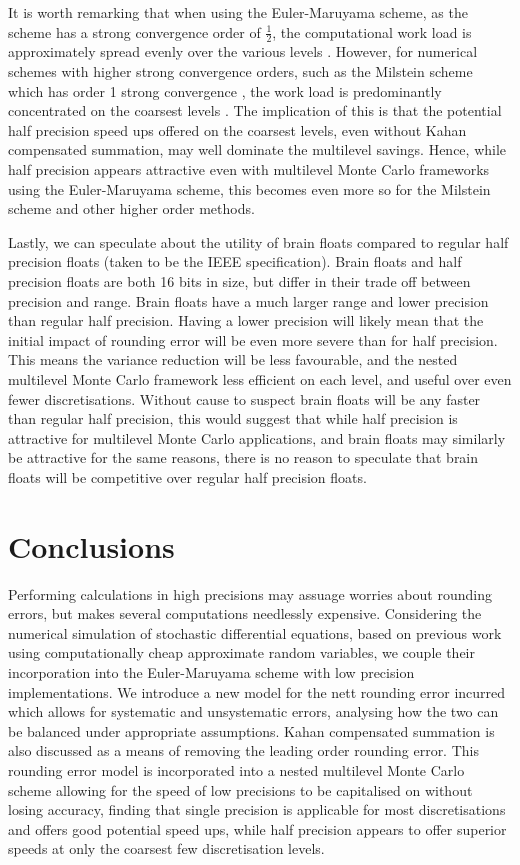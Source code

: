 \documentclass[9pt,a4paper,english]{extarticle}
\begin{document}
It is worth remarking that when using the Euler-Maruyama scheme, as the scheme has a strong convergence order of $ \tfrac{1}{2} $, the computational work load is approximately spread evenly over the various levels \citep{giles2008multilevel}. However, for numerical schemes with higher strong convergence orders, such as the Milstein scheme which has order 1 strong convergence \citep{kloeden1999numerical,glasserman2013monte}, the work load is predominantly concentrated on the coarsest levels \citep{giles2008multilevel}. The implication of this is that the potential half precision speed ups offered on the coarsest levels, even without Kahan compensated summation, may well dominate the multilevel savings. Hence, while half precision appears attractive even with multilevel Monte Carlo frameworks using the Euler-Maruyama scheme, this becomes even more so for the Milstein scheme and other higher order methods. 

Lastly, we can speculate about the utility of brain floats compared to regular half precision floats (taken to be the IEEE specification). Brain floats and half precision floats are both 16 bits in size, but differ in their trade off between precision and range. Brain floats have a much larger range and lower precision than regular half precision. Having a lower precision will likely mean that the initial impact of rounding error will be even more severe than for half precision. This means the variance reduction will be less favourable, and the nested multilevel Monte Carlo framework less efficient on each level, and useful over even fewer discretisations. Without cause to suspect brain floats will be any faster than regular half precision, this would suggest that while half precision is attractive for multilevel Monte Carlo applications, and brain floats may similarly be attractive for the same reasons, there is no reason to speculate that brain floats will be competitive over regular half precision floats. 

\section{Conclusions}
\label{sec:conclusions}

Performing calculations in high precisions may assuage worries about rounding errors, but makes several computations needlessly expensive. Considering the numerical simulation of stochastic differential equations, based on previous work using computationally cheap approximate random variables, we couple their incorporation into the Euler-Maruyama scheme with low precision implementations. We introduce a new model for the nett rounding error incurred which allows for systematic and unsystematic errors, analysing how the two can be balanced under appropriate assumptions. Kahan compensated summation is also discussed as a means of removing the leading order rounding error. This rounding error model is incorporated into a nested multilevel Monte Carlo scheme allowing for the speed of low precisions to be capitalised on without losing accuracy, finding that single precision is applicable for most discretisations and offers good potential speed ups, while half precision appears to offer superior speeds at only the coarsest few discretisation levels. 
\end{document}

